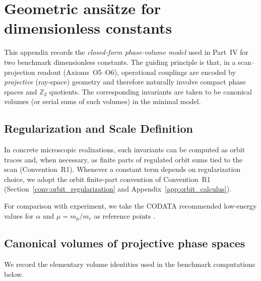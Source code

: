 \section{Geometric ans\"atze for dimensionless constants}
\label{app:constants_proof}

This appendix records the \emph{closed-form phase-volume model} used in Part~IV for two benchmark dimensionless constants. The guiding principle is that, in a scan--projection readout (Axioms~O5--O6), operational couplings are encoded by \emph{projective} (ray-space) geometry and therefore naturally involve compact phase spaces and $\mathbb{Z}_2$ quotients. The corresponding invariants are taken to be canonical volumes (or serial sums of such volumes) in the minimal model.

\subsection{Regularization and Scale Definition}
In concrete microscopic realizations, such invariants can be computed as orbit traces and, when necessary, as finite parts of regulated orbit sums tied to the scan (Convention~R1). Whenever a constant term depends on regularization choice, we adopt the orbit finite-part convention of Convention~R1 (Section~\ref{conv:orbit_regularization} and Appendix~\ref{app:orbit_calculus}).
\par
\noindent
For comparison with experiment, we take the CODATA recommended low-energy values for $\alpha$ and $\mu=m_p/m_e$ as reference points \cite{CODATA2022RMP}.

\subsection{Canonical volumes of projective phase spaces}
We record the elementary volume identities used in the benchmark computations below.

